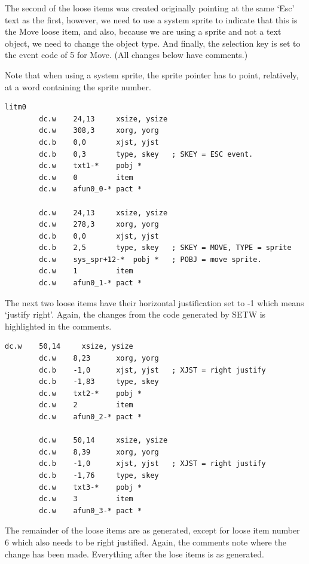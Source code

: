 The second of the loose items was created originally pointing at the
    same `Esc' text as the first, however, we need to use a system sprite to
    indicate that this is the Move loose item, and also, because we are using
    a sprite and not a text object, we need to change the object type. And
    finally, the selection key is set to the event code of 5 for Move. (All
    changes below have comments.)

Note that when using a system sprite, the sprite pointer has to
    point, relatively, at a word containing the sprite number.

\begin{lstlisting}[firstnumber=last,caption={LibGenWin\_asm - Loose Items}]
litm0
        dc.w    24,13     xsize, ysize
        dc.w    308,3     xorg, yorg
        dc.b    0,0       xjst, yjst
        dc.b    0,3       type, skey   ; SKEY = ESC event.
        dc.w    txt1-*    pobj *
        dc.w    0         item
        dc.w    afun0_0-* pact *

        dc.w    24,13     xsize, ysize
        dc.w    278,3     xorg, yorg
        dc.b    0,0       xjst, yjst
        dc.b    2,5       type, skey   ; SKEY = MOVE, TYPE = sprite
        dc.w    sys_spr+12-*  pobj *   ; POBJ = move sprite.
        dc.w    1         item
        dc.w    afun0_1-* pact *        
\end{lstlisting}

The next two loose items have their horizontal justification set to
    -{}1 which means `justify right'. Again, the changes from the code generated
	    by SETW is highlighted in the comments.

\begin{lstlisting}[firstnumber=last,caption={LibGenWin\_asm - Loose Items - Continued}]
        dc.w    50,14     xsize, ysize
        dc.w    8,23      xorg, yorg
        dc.b    -1,0      xjst, yjst   ; XJST = right justify
        dc.b    -1,83     type, skey
        dc.w    txt2-*    pobj *
        dc.w    2         item
        dc.w    afun0_2-* pact *
        
        dc.w    50,14     xsize, ysize
        dc.w    8,39      xorg, yorg
        dc.b    -1,0      xjst, yjst   ; XJST = right justify
        dc.b    -1,76     type, skey
        dc.w    txt3-*    pobj *
        dc.w    3         item
        dc.w    afun0_3-* pact *
\end{lstlisting}

The remainder of the loose items are as generated, except for loose
    item number 6 which also needs to be right justified. Again, the comments
    note where the change has been made. Everything after the lose items is as
    generated.

